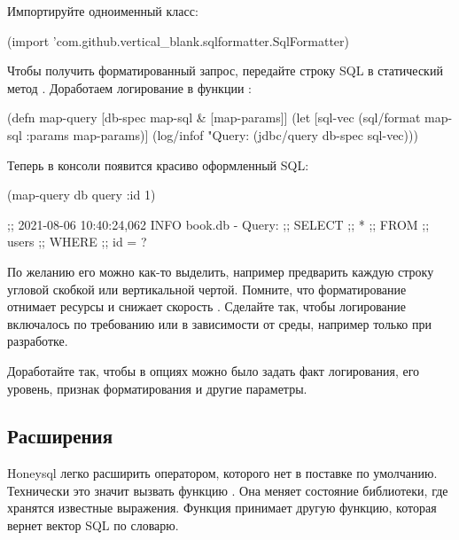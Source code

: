 Импортируйте одноименный класс:

\begin{english}
  \begin{clojure}
(import 'com.github.vertical_blank.sqlformatter.SqlFormatter)
  \end{clojure}
\end{english}

Чтобы получить форматированный запрос, передайте строку SQL в статический метод . Доработаем логирование в функции :

\begin{english}
  \begin{clojure}
(defn map-query [db-spec map-sql & [map-params]]
  (let [sql-vec (sql/format map-sql {:params map-params})]
    (log/infof "Query:\n%
    (jdbc/query db-spec sql-vec)))
  \end{clojure}
\end{english}

Теперь в консоли появится красиво оформленный SQL:

\begin{english}
  \begin{clojure}
(map-query db query {:id 1})

;; 2021-08-06 10:40:24,062 INFO  book.db - Query:
;; SELECT
;;  *
;; FROM
;;   users
;; WHERE
;;  id = ?
  \end{clojure}
\end{english}

По желанию его можно как-то выделить, например предварить каждую строку угловой скобкой или вертикальной чертой. Помните, что форматирование отнимает ресурсы и снижает скорость . Сделайте так, чтобы логирование включалось по требованию или в зависимости от среды, например только при разработке.

Доработайте  так, чтобы в опциях можно было задать факт логирования, его уровень, признак форматирования и другие параметры.

\subsection{Расширения}

Honeysql легко расширить оператором, которого нет в поставке по умолчанию. Технически это значит вызвать функцию . Она меняет состояние библиотеки, где хранятся известные выражения. Функция принимает другую функцию, которая вернет вектор SQL по словарю.

